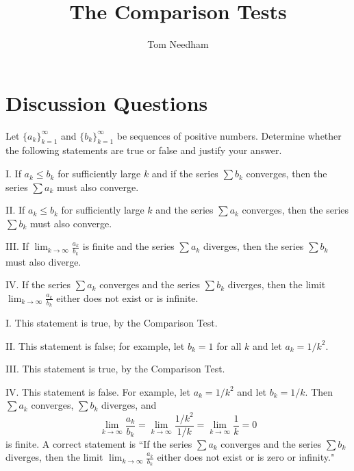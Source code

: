 \documentclass[]{ximera}
\author{Tom Needham}
\title[Collaborate:]{The Comparison Tests}
\begin{document}
\begin{abstract}
\end{abstract}
\maketitle

\vspace{-.9in}

\section{Discussion Questions}

\begin{problem}
Let $\{a_k\}_{k=1}^\infty$ and $\{b_k\}_{k=1}^\infty$ be sequences of positive numbers. Determine whether the following statements are true or false and justify your answer.

I. If $a_k \leq b_k$ for sufficiently large $k$ and if the series $\sum b_k$ converges, then the series $\sum a_k$ must also converge.

II. If $a_k \leq b_k$ for sufficiently large $k$ and the series $\sum a_k$ converges, then the series $\sum b_k$ must also converge. 

III. If $\lim_{k \rightarrow \infty} \frac{a_k}{b_k}$ is finite and the series $\sum a_k$ diverges, then the series $\sum b_k$ must also diverge.

IV. If the series $\sum a_k$ converges and the series $\sum b_k$ diverges, then the limit $\lim_{k \rightarrow \infty} \frac{a_k}{b_k}$ either does not exist or is infinite. 

\begin{solution}
I. This statement is true, by the Comparison Test.

II. This statement is false; for example, let $b_k = 1$ for all $k$ and let $a_k = 1/k^2$. 

III. This statement is true, by the Comparison Test.

IV. This statement is false. For example, let $a_k = 1/k^2$ and let $b_k = 1/k$. Then $\sum a_k$ converges, $\sum b_k$ diverges, and
$$
\lim_{k \rightarrow \infty} \frac{a_k}{b_k} = \lim_{k \rightarrow \infty} \frac{1/k^2}{1/k} = \lim_{k \rightarrow \infty} \frac{1}{k} = 0
$$
is finite. A correct statement is ``If the series $\sum a_k$ converges and the series $\sum b_k$ diverges, then the limit $\lim_{k \rightarrow \infty} \frac{a_k}{b_k}$ either does not exist or is zero or infinity."
\end{solution}
\end{problem}
\end{document}
